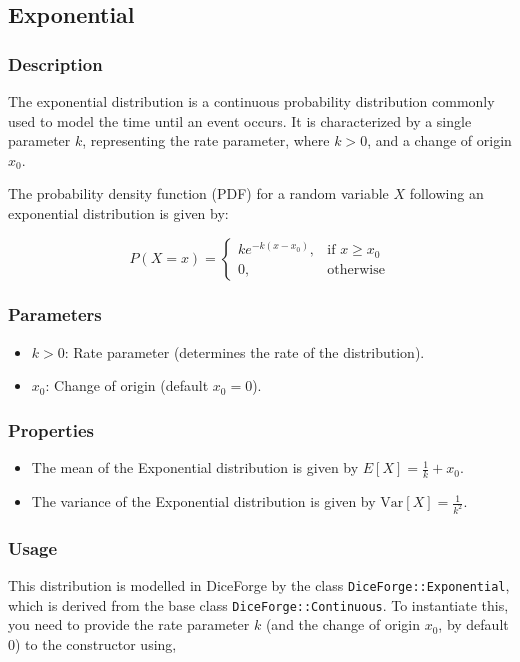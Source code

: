 \documentclass[titlepage, 11pt]{article}
\newcommand{\code}[1]
{\colorbox{light-gray}{\texttt{#1}}}
\begin{document}
\subsection{Exponential}
\subsubsection{Description}
The exponential distribution is a continuous probability distribution commonly used to model the time until an event occurs. It is characterized by a single parameter $k$, representing the rate parameter, where $k > 0$, and a change of origin $x_0$.

The probability density function (PDF) for a random variable $X$ following an exponential distribution is given by:

\begin{equation}
P(X=x) = \begin{cases} 
k e^{-k(x-x_0)}, & \text{if } x \geq x_0 \\
0, & \text{otherwise}
\end{cases}
\end{equation}

\subsubsection{Parameters}
\begin{itemize}
    \item $k > 0$: Rate parameter (determines the rate of the distribution).
    \item $x_0$: Change of origin (default $x_0=0$).
\end{itemize}

\subsubsection{Properties}
\begin{itemize}
    \item The mean of the Exponential distribution is given by $E[X] = \frac{1}{k} + x_0$.
    \item The variance of the Exponential distribution is given by $\text{Var}[X] = \frac{1}{k^2}$.
\end{itemize}

\subsubsection{Usage}
This distribution is modelled in DiceForge by the class \code{DiceForge::Exponential}, which is derived from the base class \code{DiceForge::Continuous}. To instantiate this, you need to provide the rate parameter $k$ (and the change of origin $x_0$, by default $0$) to the constructor using,
\end{document}
